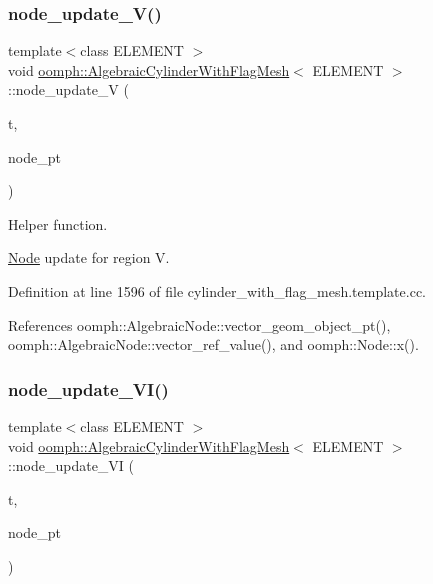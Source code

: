 \subsubsection{\texorpdfstring{node\+\_\+update\+\_\+\+V()}{node\_update\_V()}}
{\footnotesize\ttfamily template$<$class E\+L\+E\+M\+E\+NT $>$ \\
void \hyperlink{classoomph_1_1AlgebraicCylinderWithFlagMesh}{oomph\+::\+Algebraic\+Cylinder\+With\+Flag\+Mesh}$<$ E\+L\+E\+M\+E\+NT $>$\+::node\+\_\+update\+\_\+V (\begin{DoxyParamCaption}\item[{const unsigned \&}]{t,  }\item[{\hyperlink{classoomph_1_1AlgebraicNode}{Algebraic\+Node} $\ast$\&}]{node\+\_\+pt }\end{DoxyParamCaption})\hspace{0.3cm}{\ttfamily [protected]}}



Helper function. 

\hyperlink{classoomph_1_1Node}{Node} update for region V. 

Definition at line 1596 of file cylinder\+\_\+with\+\_\+flag\+\_\+mesh.\+template.\+cc.



References oomph\+::\+Algebraic\+Node\+::vector\+\_\+geom\+\_\+object\+\_\+pt(), oomph\+::\+Algebraic\+Node\+::vector\+\_\+ref\+\_\+value(), and oomph\+::\+Node\+::x().

\mbox{\label{classoomph_1_1AlgebraicCylinderWithFlagMesh_a989fe557f03ac20812e69a8de2dbb9a4}} 
\subsubsection{\texorpdfstring{node\+\_\+update\+\_\+\+V\+I()}{node\_update\_VI()}}
{\footnotesize\ttfamily template$<$class E\+L\+E\+M\+E\+NT $>$ \\
void \hyperlink{classoomph_1_1AlgebraicCylinderWithFlagMesh}{oomph\+::\+Algebraic\+Cylinder\+With\+Flag\+Mesh}$<$ E\+L\+E\+M\+E\+NT $>$\+::node\+\_\+update\+\_\+\+VI (\begin{DoxyParamCaption}\item[{const unsigned \&}]{t,  }\item[{\hyperlink{classoomph_1_1AlgebraicNode}{Algebraic\+Node} $\ast$\&}]{node\+\_\+pt }\end{DoxyParamCaption})\hspace{0.3cm}{\ttfamily [protected]}}



